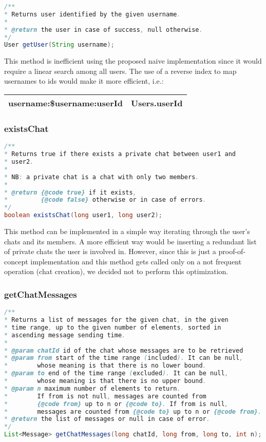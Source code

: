 \documentclass[10pt]{article}
\begin{document}
\begin{lstlisting}[language = Java]
/**
* Returns user identified by the given username.
*
* @return the user in case of success, null otherwise.
*/
User getUser(String username);
\end{lstlisting}

This method is inefficient using the proposed naive implementation since it 
would require a linear search among all users. 
The use of a reverse index to map usernames to ids would make it more efficient, i.e.:

\begin{center}
    \begin{tabular}{ | c | c | }
        \hline
        username:\$username:userId & Users.userId \\\hline
    \end{tabular}
\end{center}

\subsubsection{existsChat}

\begin{lstlisting}[language = Java]
/**
* Returns true if there exists a private chat between user1 and 
* user2.
*
* NB: a private chat is a chat with only two members.
*
* @return {@code true} if it exists, 
*         {@code false} otherwise or in case of errors.
*/
boolean existsChat(long user1, long user2);
\end{lstlisting}

This method can be implemented in a simple way iterating through the 
user's chats and its members. A more efficient way would be inserting a
redundant list of private chats the user is involved in.
However, since this is just a proof-of-concept implementation and this method gets 
called only on a not frequent operation (chat creation), we decided not to
perform this optimization.

\subsubsection{getChatMessages}

\begin{lstlisting}[language = Java]
/**
* Returns a list of messages for the given chat, in the given 
* time range, up to the given number of elements, sorted in 
* ascending message sending time.
*
* @param chatId id of the chat whose messages are to be retrieved
* @param from start of the time range (included). It can be null, 
*        whose meaning is that there is no lower bound.
* @param to end of the time range (excluded). It can be null, 
*        whose meaning is that there is no upper bound.
* @param n maximum number of elements to return. 
*        If from is not null, messages are counted from 
*        {@code from} up to n or {@code to}. If from is null, 
*        messages are counted from {@code to} up to n or {@code from}.
* @return the list of messages or null in case of error.
*/
List<Message> getChatMessages(long chatId, long from, long to, int n);
\end{lstlisting}
\end{document}
